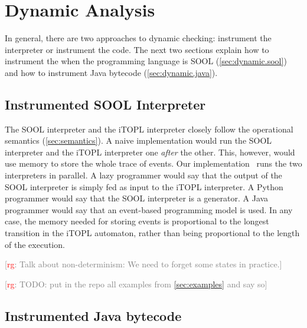 \documentclass[preprint]{sigplanconf} %
\newcommand{\note}[2]{\textcolor{gray}{[\textcolor{red}{#1}: #2]}}
\newcommand{\rg}[1]{\note{rg}{#1}}
\theoremstyle{definition}
\theoremstyle{remark}
\begin{document}
\section{Dynamic Analysis}\label{sec:dynamic} %

In general, there are two approaches to dynamic checking: instrument the interpreter or instrument the code.
The next two sections explain how to instrument the 	 when the programming language is SOOL (\autoref{sec:dynamic.sool}) and how to instrument Java bytecode (\autoref{sec:dynamic.java}).

\subsection{Instrumented SOOL Interpreter}\label{sec:dynamic.sool} %

The SOOL interpreter and the iTOPL interpreter closely follow the operational semantics (\autoref{sec:semantics}).
A naive implementation would run the SOOL interpreter and the iTOPL interpreter one \emph{after} the other.
This, however, would use memory to store the whole trace of events.
Our implementation~\cite{web:topl.prototype} runs the two interpreters in parallel.
A lazy programmer would say that the output of the SOOL interpreter is simply fed as input to the iTOPL interpreter.
A Python programmer would say that the SOOL interpreter is a generator.
A Java programmer would say that an event-based programming model is used.
In any case, the memory needed for storing events is proportional to the longest transition in the iTOPL automaton, rather than being proportional to the length of the execution.

\rg{Talk about non-determinism: We need to forget some states in practice.}

\rg{TODO: put in the repo all examples from \autoref{sec:examples} and say so}

\subsection{Instrumented Java bytecode}\label{sec:dynamic.java} %

\end{document}
